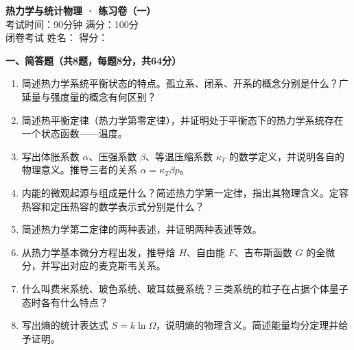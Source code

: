 \documentclass[12pt,a4paper,fontset=mac]{ctexart}
\newcommand{\đ}{\mathrm{đ}}
\newcommand{\shortanswer}{\vspace{5.5cm}}
\begin{document}
\begin{center}
{\LARGE \textbf{热力学与统计物理 · 练习卷（一）}}\\[0.5em]
{\large 考试时间：90分钟 \quad 满分：100分}\\[0.3em]
{\normalsize 闭卷考试 \quad 姓名：\underline{\hspace{3cm}} \quad 得分：\underline{\hspace{2cm}}}
\end{center}

\vspace{0.5em}

\noindent\textbf{一、简答题（共8题，每题8分，共64分）}

\begin{enumerate}
\item 简述热力学系统平衡状态的特点。孤立系、闭系、开系的概念分别是什么？广延量与强度量的概念有何区别？
\shortanswer

\item 简述热平衡定律（热力学第零定律），并证明处于平衡态下的热力学系统存在一个状态函数——温度。
\shortanswer

\item 写出体胀系数 $\alpha$、压强系数 $\beta$、等温压缩系数 $\kappa_T$ 的数学定义，并说明各自的物理意义。推导三者的关系 $\alpha = \kappa_T \beta p$。
\shortanswer

\item 内能的微观起源与组成是什么？简述热力学第一定律，指出其物理含义。定容热容和定压热容的数学表示式分别是什么？
\shortanswer

\item 简述热力学第二定律的两种表述，并证明两种表述等效。
\shortanswer

\item 从热力学基本微分方程出发，推导焓 $H$、自由能 $F$、吉布斯函数 $G$ 的全微分，并写出对应的麦克斯韦关系。
\shortanswer

\item 什么叫费米系统、玻色系统、玻耳兹曼系统？三类系统的粒子在占据个体量子态时各有什么特点？
\shortanswer

\item 写出熵的统计表达式 $S = k\ln\Omega$，说明熵的物理含义。简述能量均分定理并给予证明。
\shortanswer

\end{enumerate}

\newpage
\end{document}
